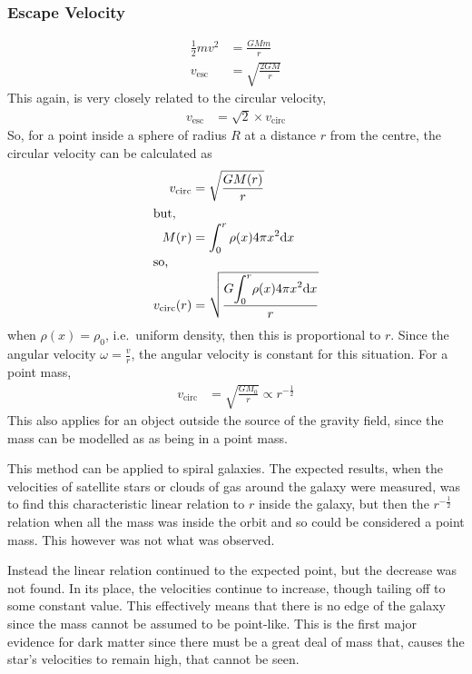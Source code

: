 \documentclass[british]{article}
\renewcommand{\d}{\mathrm{d}} %
\newcommand{\sintertext}[1]{\intertext{#1}\\[-0.7cm]}
\begin{document}
\subsubsection{Escape Velocity}
\begin{align*}
	\frac{1}{2}mv^2 &= \frac{GMm}{r} \\
	v_{\text{esc}} &= \sqrt{\frac{2GM}{r}}
\end{align*}
This again, is very closely related to the circular velocity,
\begin{align*}
	v_{\text{esc}} &= \sqrt{2} \times v_{\text{circ}}
\end{align*}
So, for a point inside a sphere of radius $R$ at a distance $r$ from the centre, the circular velocity can be calculated as
\begin{align*}
	v_{\text{circ}} &= \sqrt{\frac{GM(r)}{r}}\\
\sintertext{but,}
	M(r) &= \int_0^r \rho(x) 4\pi x^2 \d{x}\\
\sintertext{so,}
	v_{\text{circ}}(r) &= \sqrt{\frac{G \displaystyle{\int_0^r} \rho(x)4\pi x^2 \d{x}}{r}}\\
\end{align*}
when $\rho(x)=\rho _0$, i.e.\ uniform density, then this is proportional to $r$. Since the angular velocity $\omega = \frac{v}{r}$, the angular velocity is constant for this situation. For a point mass,
\begin{align*}
	v_{\text{circ}} &= \sqrt{\frac{GM_0}{r}} \propto r^{-\frac{1}{2}}
\end{align*} 
This also applies for an object outside the source of the gravity field, since the mass can be modelled as as being in a point mass. 

This method can be applied to spiral galaxies. The expected results, when the velocities of satellite stars or clouds of gas around the galaxy were measured, was to find this characteristic  linear relation to $r$ inside the galaxy, but then the $r^{-\frac{1}{2}}$ relation when all the mass was inside the orbit and so could be considered a point mass. This however was not what was observed. 

Instead the linear relation continued to the expected point, but the decrease was not found. In its place, the velocities continue to increase, though tailing off to some constant value. This effectively means that there is no edge of the galaxy since the mass cannot be assumed to be point-like. This is the first major evidence for dark matter since there must be a great deal of mass that, causes the star's velocities to remain high, that cannot be seen.
\end{document}

